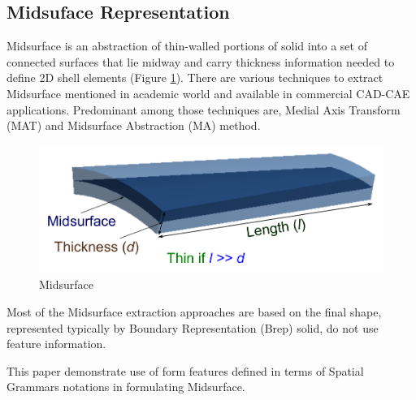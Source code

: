 \subsection{Midsuface Representation}

Midsurface is an abstraction of thin-walled portions of solid into a set of connected surfaces that lie midway and carry thickness information needed to deﬁne 2D shell elements  (Figure \ref{figure_Midsurf}). There are various techniques to extract Midsurface mentioned in academic world and available in commercial CAD-CAE applications. Predominant among those techniques are, Medial Axis Transform (MAT) and Midsurface Abstraction (MA) method. 

	\begin{figure}[h]
	\includegraphics[scale=0.4]{../Common/images//Midsurf.pdf}
	\caption{Midsurface}
	\label{figure_Midsurf}
	\end{figure}

Most of the Midsurface extraction approaches are based on the final shape, represented typically by Boundary Representation (Brep) solid, do not use feature information. 

This paper demonstrate use of form features defined in terms of  Spatial Grammars notations in formulating Midsurface.
